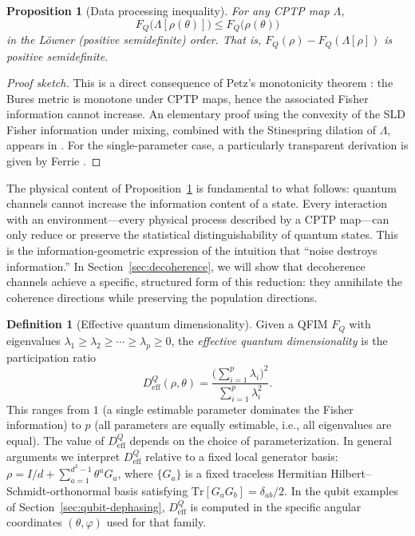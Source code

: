 \documentclass[12pt,a4paper]{article}
\newtheorem{proposition}[theorem]{Proposition}
\theoremstyle{definition}
\newtheorem{definition}[theorem]{Definition}
\theoremstyle{remark}
\begin{document}
\begin{proposition}[Data processing inequality]
\label{prop:dpi}
For any CPTP map $\Lambda$,
\begin{equation}
\label{eq:dpi}
F_Q\bigl(\Lambda[\rho(\theta)]\bigr) \leq F_Q\bigl(\rho(\theta)\bigr)
\end{equation}
in the L\"owner (positive semidefinite) order. That is, $F_Q(\rho) - F_Q(\Lambda[\rho])$ is positive semidefinite.
\end{proposition}

\begin{proof}[Proof sketch]
This is a direct consequence of Petz's monotonicity theorem \cite{petz1996monotone}: the Bures metric is monotone under CPTP maps, hence the associated Fisher information cannot increase. An elementary proof using the convexity of the SLD Fisher information under mixing, combined with the Stinespring dilation of $\Lambda$, appears in \cite{liu2020quantum}. For the single-parameter case, a particularly transparent derivation is given by Ferrie \cite{ferrie2014best}.
\end{proof}

The physical content of Proposition~\ref{prop:dpi} is fundamental to what follows: quantum channels cannot increase the information content of a state. Every interaction with an environment---every physical process described by a CPTP map---can only reduce or preserve the statistical distinguishability of quantum states. This is the information-geometric expression of the intuition that ``noise destroys information.'' In Section~\ref{sec:decoherence}, we will show that decoherence channels achieve a specific, structured form of this reduction: they annihilate the coherence directions while preserving the population directions.

\begin{definition}[Effective quantum dimensionality]
\label{def:deff}
Given a QFIM $F_Q$ with eigenvalues $\lambda_1 \geq \lambda_2 \geq \cdots \geq \lambda_p \geq 0$, the \emph{effective quantum dimensionality} is the participation ratio
\begin{equation}
\label{eq:deff}
D_{\mathrm{eff}}^Q(\rho, \theta) = \frac{\bigl(\sum_{i=1}^p \lambda_i\bigr)^2}{\sum_{i=1}^p \lambda_i^2}.
\end{equation}
This ranges from $1$ (a single estimable parameter dominates the Fisher information) to $p$ (all parameters are equally estimable, i.e., all eigenvalues are equal).  The value of $D_{\mathrm{eff}}^Q$ depends on the choice of parameterization.  In general arguments we interpret $D_{\mathrm{eff}}^Q$ relative to a fixed local generator basis: $\rho = I/d + \sum_{a=1}^{d^2-1} \theta^a G_a$, where $\{G_a\}$ is a fixed traceless Hermitian Hilbert--Schmidt-orthonormal basis satisfying $\mathrm{Tr}[G_a G_b] = \delta_{ab}/2$.  In the qubit examples of Section~\ref{sec:qubit-dephasing}, $D_{\mathrm{eff}}^Q$ is computed in the specific angular coordinates $(\theta,\varphi)$ used for that family.
\end{definition}
\end{document}
